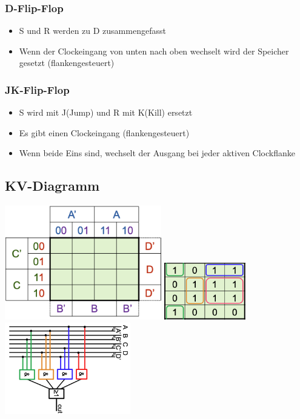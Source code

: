 \documentclass[6pt,a4paper]{scrartcl}
\begin{document}
\begin{multicols*}{4}
				\subsubsection{D-Flip-Flop}
					\begin{itemize}\itemsep0pt
						\item S und R werden zu D zusammengefasst
						\item Wenn der Clockeingang von unten nach oben wechselt wird der Speicher gesetzt (flankengesteuert)
					\end{itemize}
					
				\subsubsection{JK-Flip-Flop}
					\begin{itemize}\itemsep0pt
						\item S wird mit J(Jump) und R mit K(Kill) ersetzt
						\item Es gibt einen Clockeingang (flankengesteuert)
						\item Wenn beide Eins sind, wechselt der Ausgang bei jeder aktiven Clockflanke
					\end{itemize}
					
			\subsection{KV-Diagramm}
				\includegraphics[height=5cm]{img/kv1.png} 
				\includegraphics[height=2.5cm]{img/kv2.png} 
				\includegraphics[height=4cm]{img/kv3.png} 



\end{multicols*}
\end{document}
